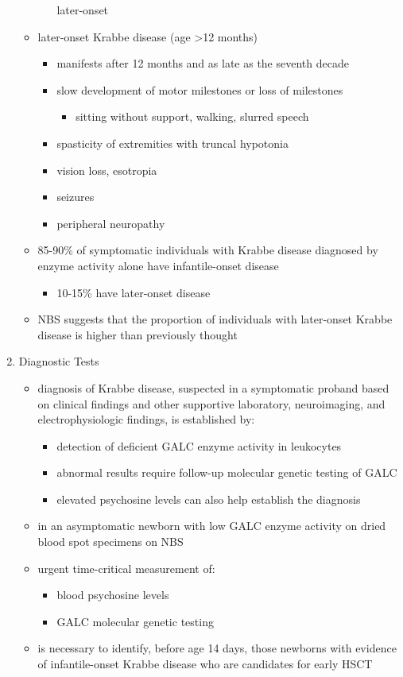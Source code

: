 \documentclass{scrartcl}
\begin{document}
\begin{enumerate}
\begin{itemize}
\begin{itemize}
\item[{later-onset}] 
\end{itemize}
\item later-onset Krabbe disease (age >12 months)
\begin{itemize}
\item manifests after 12 months and as late as the seventh decade
\item slow development of motor milestones or loss of milestones
\begin{itemize}
\item sitting without support, walking, slurred speech
\end{itemize}
\item spasticity of extremities with truncal hypotonia
\item vision loss, esotropia
\item seizures
\item peripheral neuropathy
\end{itemize}

\item 85-90\% of symptomatic individuals with Krabbe disease diagnosed by
enzyme activity alone have infantile-onset disease
\begin{itemize}
\item 10-15\% have later-onset disease
\end{itemize}
\item NBS suggests that the proportion of individuals with later-onset
Krabbe disease is higher than previously thought
\end{itemize}

\item Diagnostic Tests
\label{sec:orgcb4e171}
\begin{itemize}
\item diagnosis of Krabbe disease, suspected in a symptomatic proband
based on clinical findings and other supportive laboratory,
neuroimaging, and electrophysiologic findings, is established by:
\begin{itemize}
\item detection of deficient GALC enzyme activity in leukocytes
\item abnormal results require follow-up molecular genetic testing of GALC
\item elevated psychosine levels can also help establish the diagnosis
\end{itemize}

\item in an asymptomatic newborn with low GALC enzyme activity
on dried blood spot specimens on NBS
\item urgent time-critical measurement of:
\begin{itemize}
\item blood psychosine levels
\item GALC molecular genetic testing
\end{itemize}
\item is necessary to identify, before age 14 days, those newborns with
evidence of infantile-onset Krabbe disease who are candidates for
early HSCT
\end{itemize}


\end{enumerate}
\end{document}
